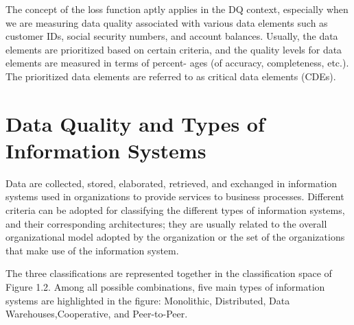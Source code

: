 The concept of the loss function aptly applies in the DQ context, especially when we are measuring data quality associated with various data
elements such as customer IDs, social security numbers, and account balances. Usually, the data elements are prioritized based on certain criteria,
and the quality levels for data elements are measured in terms of percent-
ages (of accuracy, completeness, etc.). The prioritized data elements are
referred to as critical data elements (CDEs).

\section{Data Quality and Types of Information Systems}

Data are collected, stored, elaborated, retrieved, and exchanged in information systems used in organizations to provide services to business processes.
Different criteria can be adopted for classifying the different types of information systems, and their corresponding architectures; they are usually related to
the overall organizational model adopted by the organization or the set of the
organizations that make use of the information system.

The three classifications are represented together in the classification space of Figure 1.2.
Among all possible combinations, five main types of information systems are highlighted in the figure:
Monolithic, Distributed, Data Warehouses,Cooperative, and Peer-to-Peer.

